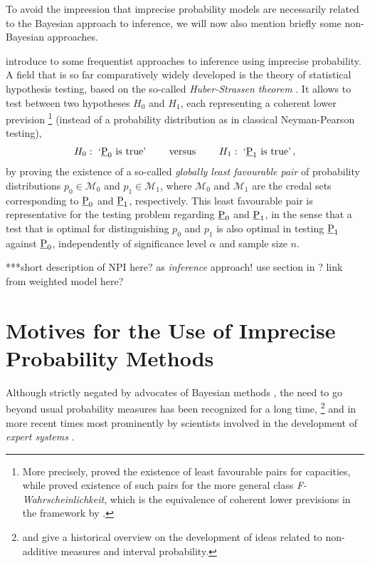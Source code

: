 To avoid the impression that imprecise probability models are necessarily related
to the Bayesian approach to inference,
we will now also mention briefly some non-Bayesian approaches.

\textcite[\S 5]{itip-statinf} introduce to some frequentist approaches to inference using imprecise probability.
A field that is so far comparatively widely developed
is the theory of statistical hypothesis testing,
based on the so-called \emph{Huber-Strassen theorem} \parencite[Theorem~4.1]{1973:huberstrassen}.
It allows to test between two hypotheses $H_0$ and $H_1$,
each representing a coherent lower prevision%
\footnote{More precisely, \textcite{1973:huberstrassen} proved the existence of least favourable pairs
for capacities, while \textcite{1998:augustin} proved existence of such pairs
for the more general class \emph{F-Wahrscheinlichkeit},
which is the equivalence of coherent lower previsions in the framework by \textcite{2001:weichselberger}.}
(instead of a probability distribution as in classical Neyman-Pearson testing),
\begin{align*}
H_0:\ `\underline{\operatorname{P}}_0 \text{ is true'  \qquad versus \qquad } H_1:\   `\underline{\operatorname{P}}_1 \text{ is true'}\,,
\end{align*}
by proving the existence of a so-called \emph{globally least favourable pair}
of probability distributions $p_0 \in \mathcal{M}_0$ and $p_1 \in \mathcal{M}_1$,
where $\mathcal{M}_0$ and $\mathcal{M}_1$ are the credal sets
corresponding to $\underline{\operatorname{P}}_0$ and $\underline{\operatorname{P}}_1$, respectively.
This least favourable pair is representative for the testing problem regarding $\underline{\operatorname{P}}_0$ and $\underline{\operatorname{P}}_1$,
in the sense that a test that is optimal for distinguishing $p_0$ and $p_1$
is also optimal in testing $\underline{\operatorname{P}}_1$ against $\underline{\operatorname{P}}_0$,
independently of significance level $\alpha$ and sample size $n$.

***short description of NPI here? as \emph{inference} approach! 
use section in \cite{itip-statinf}? link from weighted model here?



\section{Motives for the Use of Imprecise Probability Methods}
\label{sec:motivation}

Although strictly negated by advocates of Bayesian methods \parencite[e.g., by][]{1987:lindley},
the need to go beyond usual probability measures has been recognized for a long time,%
\footnote{\textcite{2009:hampel} and \textcite[\S 1]{2001:weichselberger} give a historical overview on the development of
ideas related to non-additive measures and interval probability.}
and in more recent times most prominently by scientists involved in the development of \emph{expert systems}
\parencite[see, e.g.,][]{1996:walley::expert}.%

